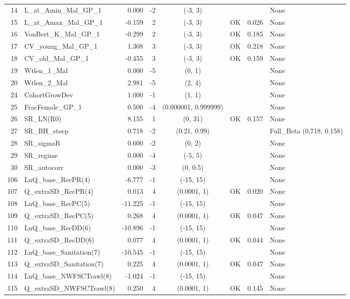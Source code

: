 \documentclass[12pt,]{article}
\begin{document}
\begin{landscape}
\begin{longtable}{rlrrcccl}
  14 & L\_at\_Amin\_Mal\_GP\_1 & 0.000 & -2 & (-3, 3) &  &  & None \\ 
  15 & L\_at\_Amax\_Mal\_GP\_1 & -0.159 & 2 & (-3, 3) & OK & 0.026 & None \\ 
  16 & VonBert\_K\_Mal\_GP\_1 & -0.299 & 2 & (-3, 3) & OK & 0.185 & None \\ 
  17 & CV\_young\_Mal\_GP\_1 & 1.308 & 3 & (-3, 3) & OK & 0.218 & None \\ 
  18 & CV\_old\_Mal\_GP\_1 & -0.455 & 3 & (-3, 3) & OK & 0.159 & None \\ 
  19 & Wtlen\_1\_Mal & 0.000 & -5 & (0, 1) &  &  & None \\ 
  20 & Wtlen\_2\_Mal & 2.981 & -5 & (2, 4) &  &  & None \\ 
  24 & CohortGrowDev & 1.000 & -1 & (1, 1) &  &  & None \\ 
  25 & FracFemale\_GP\_1 & 0.500 & -4 & (0.000001, 0.999999) &  &  & None \\ 
  26 & SR\_LN(R0) & 8.155 & 1 & (0, 31) & OK & 0.157 & None \\ 
  27 & SR\_BH\_steep & 0.718 & -2 & (0.21, 0.99) &  &  & Full\_Beta (0.718, 0.158) \\ 
  28 & SR\_sigmaR & 0.600 & -2 & (0, 2) &  &  & None \\ 
  29 & SR\_regime & 0.000 & -4 & (-5, 5) &  &  & None \\ 
  30 & SR\_autocorr & 0.000 & -3 & (0, 0.5) &  &  & None \\ 
  106 & LnQ\_base\_RecPR(4) & -6.777 & -1 & (-15, 15) &  &  & None \\ 
  107 & Q\_extraSD\_RecPR(4) & 0.013 & 4 & (0.0001, 1) & OK & 0.020 & None \\ 
  108 & LnQ\_base\_RecPC(5) & -11.225 & -1 & (-15, 15) &  &  & None \\ 
  109 & Q\_extraSD\_RecPC(5) & 0.268 & 4 & (0.0001, 1) & OK & 0.047 & None \\ 
  110 & LnQ\_base\_RecDD(6) & -10.896 & -1 & (-15, 15) &  &  & None \\ 
  111 & Q\_extraSD\_RecDD(6) & 0.077 & 4 & (0.0001, 1) & OK & 0.044 & None \\ 
  112 & LnQ\_base\_Sanitation(7) & -10.545 & -1 & (-15, 15) &  &  & None \\ 
  113 & Q\_extraSD\_Sanitation(7) & 0.225 & 4 & (0.0001, 1) & OK & 0.047 & None \\ 
  114 & LnQ\_base\_NWFSCTrawl(8) & -1.024 & -1 & (-15, 15) &  &  & None \\ 
  115 & Q\_extraSD\_NWFSCTrawl(8) & 0.250 & 4 & (0.0001, 1) & OK & 0.145 & None \\ 

\end{longtable}
\end{landscape}
\end{document}

